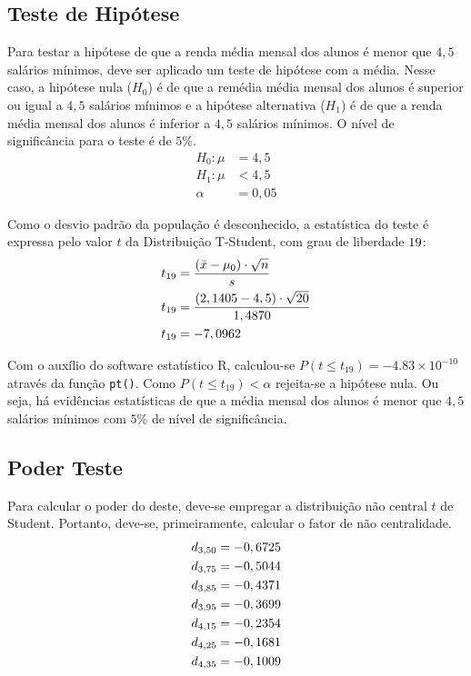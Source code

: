 

\subsection{Teste de Hipótese}

	Para testar a hipótese de que a renda média mensal dos alunos é menor
	que $4,5$ salários mínimos, deve ser aplicado um teste de hipótese com a
	média. Nesse caso, a hipótese nula ($H_0$) é de que a remédia média mensal dos
	alunos é superior ou igual a $4,5$ salários mínimos e a hipótese alternativa
	($H_1$) é de que a renda média mensal dos alunos é inferior a $4,5$ salários
	mínimos. O nível de significância para o teste é de $5\%$.
	\begin{align*}
		H_0: \mu &= 4,5\\
		H_1: \mu &< 4,5   \\
		     \alpha &= 0,05
	\end{align*}

	Como o desvio padrão da população é desconhecido, a estatística do
	teste é expressa pelo valor $t$ da Distribuição T-Student, com grau de
	liberdade $19$:
	\begin{align*}
		t_{19} &= \frac{(\bar{x} - \mu_0)\cdot\sqrt{n}}{s} \\
		t_{19} &= \dfrac{(2,1405 - 4,5) \cdot \sqrt{20}}{1,4870} \\
		t_{19} &= -7,0962
	\end{align*}

	Com o auxílio do software estatístico R, calculou-se $P(t  \leq t_{19})
	= -4.83\times 10^{-10}$ através da função \texttt{pt()}. Como $P(t  \leq
	t_{19}) < \alpha$ rejeita-se a hipótese nula. Ou seja, há evidências
	estatísticas de que a média mensal dos alunos é menor que $4,5$ salários
	mínimos com $5\%$ de nível de significância.

\subsection{Poder Teste}

	Para calcular o poder do deste, deve-se empregar a distribuição não
	central $t$ de Student. Portanto, deve-se, primeiramente, calcular o fator de
	não centralidade.
	\begin{align*}
		d_{3,50} &= -0,6725\\
		d_{3,75} &= -0,5044\\
		d_{3,85} &= -0,4371\\
		d_{3,95} &= -0,3699\\
		d_{4,15} &= -0,2354\\
		d_{4,25} &= -0,1681\\
		d_{4,35} &= -0,1009\\
	\end{align*}

